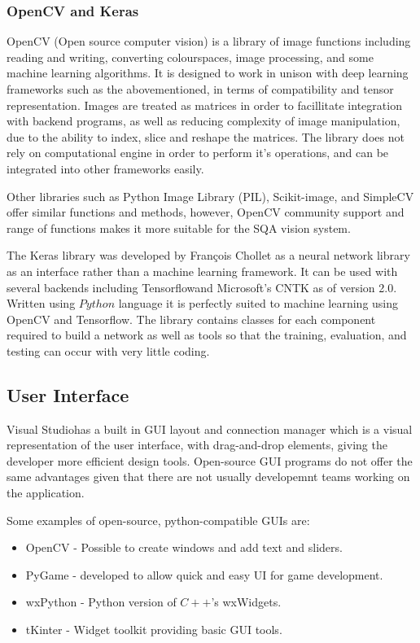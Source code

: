 \documentclass[fleqn,twoside]{article}
\begin{document}
\subsubsection{OpenCV and Keras}

OpenCV (Open source computer vision) is a library of image functions including reading and writing, converting colourspaces, image processing, and some machine learning algorithms. It is designed to work in unison with deep learning frameworks such as the abovementioned, in terms of compatibility and tensor representation. Images are treated as matrices in order to facillitate integration with backend programs, as well as reducing complexity of image manipulation, due to the ability to index, slice and reshape the matrices. The library does not rely on computational engine in order to perform it's operations, and can be integrated into other frameworks easily.

Other libraries such as Python Image Library (PIL), Scikit-image, and SimpleCV offer similar functions and methods, however, OpenCV community support and range of functions makes it more suitable for the SQA vision system.

The Keras library was developed by François Chollet as a neural network library as an interface rather than a machine learning framework. It can be used with several backends including Tensorflow\textregistered and Microsoft\textregistered's CNTK as of version 2.0. Written using $Python$ language it is perfectly suited to machine learning using OpenCV and Tensorflow\textregistered. The library contains classes for each component required to build a network as well as tools so that the training, evaluation, and testing can occur with very little coding.

\subsection{User Interface}


Visual Studio\textregistered has a built in GUI layout and connection manager which is a visual representation of the user interface, with drag-and-drop elements, giving the developer more efficient design tools. Open-source GUI programs do not offer the same advantages given that there are not usually developemnt teams working on the application. 

Some examples of open-source, python-compatible GUIs are:

\begin{itemize}
	\item OpenCV - Possible to create windows and add text and sliders.
	\item PyGame - developed to allow quick and easy UI for game development.
	\item wxPython - Python version of $C++$'s wxWidgets.
	\item tKinter - Widget toolkit providing basic GUI tools.
\end{itemize}
\end{document}

